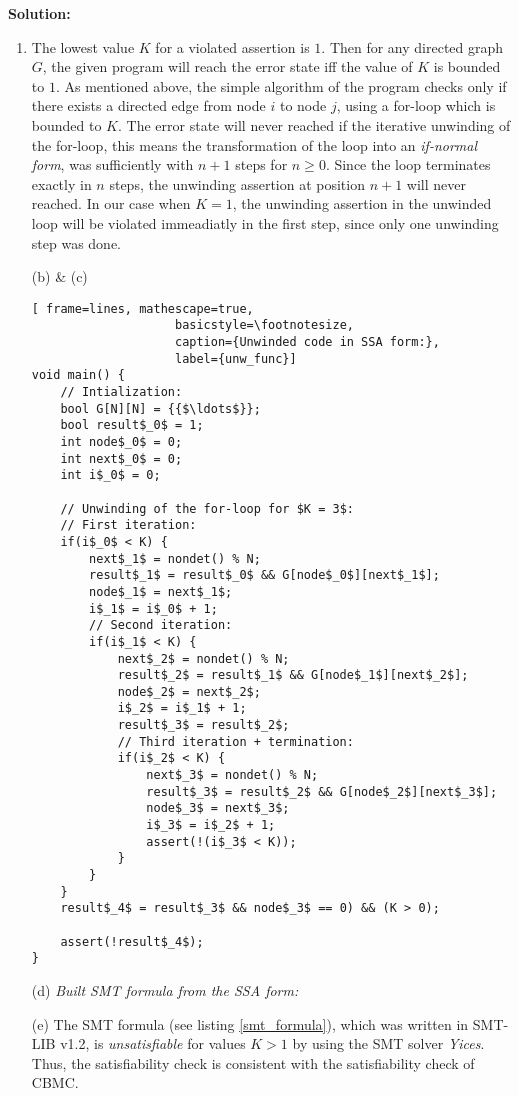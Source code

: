 \textbf{Solution:}\\
\begin{enumerate}
\item The lowest value $K$ for a violated assertion is $1$. Then for any directed
graph $G$, the given program will reach the error state iff the value of $K$
is bounded to $1$. As mentioned above, the simple algorithm of the program
checks only if there exists a directed edge from node $i$ to node $j$, using
a for-loop which is bounded to $K$. The error state will never reached if
the iterative unwinding of the for-loop, this means the transformation of
the loop into an \textit{if-normal form}, was sufficiently with $n+1$ steps
for $n\geq 0$. Since the loop terminates exactly in $n$ steps, the unwinding
assertion at position $n+1$ will never reached. In our case when $K=1$, the
unwinding assertion in the unwinded loop will be violated immeadiatly in the
first step, since only one unwinding step was done.

\item[(b) \& (c)] \quad
\medskip
\begin{lstlisting}[	frame=lines, mathescape=true,
					basicstyle=\footnotesize,
					caption={Unwinded code in SSA form:},
					label={unw_func}]
void main() {
	// Intialization:
	bool G[N][N] = {{$\ldots$}};
	bool result$_0$ = 1;
	int node$_0$ = 0;
	int next$_0$ = 0;
	int i$_0$ = 0;
	
	// Unwinding of the for-loop for $K = 3$:
	// First iteration:
	if(i$_0$ < K) {
		next$_1$ = nondet() % N;
		result$_1$ = result$_0$ && G[node$_0$][next$_1$];
		node$_1$ = next$_1$;
		i$_1$ = i$_0$ + 1;
		// Second iteration:
		if(i$_1$ < K) {
			next$_2$ = nondet() % N;
			result$_2$ = result$_1$ && G[node$_1$][next$_2$];
			node$_2$ = next$_2$;
			i$_2$ = i$_1$ + 1;
			result$_3$ = result$_2$;
			// Third iteration + termination:
			if(i$_2$ < K) {
				next$_3$ = nondet() % N;
				result$_3$ = result$_2$ && G[node$_2$][next$_3$];
				node$_3$ = next$_3$;
				i$_3$ = i$_2$ + 1;
				assert(!(i$_3$ < K));
			}
		}
	}
	result$_4$ = result$_3$ && node$_3$ == 0) && (K > 0);

	assert(!result$_4$);
}
\end{lstlisting}

\item[(d)] \textit{Built SMT formula from the SSA form:}
\medskip


\item[(e)] The SMT formula (see listing \ref{smt_formula}), which was written in SMT-LIB v1.2, is \textit{unsatisfiable} for values $K>1$ by using the SMT solver \textit{Yices}. Thus, the satisfiability check is consistent with the satisfiability check of CBMC.


\end{enumerate}